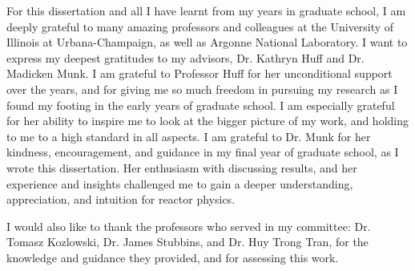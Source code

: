 For this dissertation and all I have learnt from my years in graduate school, 
I am deeply grateful to many amazing professors and colleagues at the University of 
Illinois at Urbana-Champaign, as well as Argonne National Laboratory. 
I want to express my deepest gratitudes to my advisors, Dr. Kathryn Huff and Dr. 
Madicken Munk. 
I am grateful to Professor Huff for her unconditional support over the years, and for 
giving me so much freedom in pursuing my research as I found my footing in the early 
years of graduate school. 
I am especially grateful for her ability to inspire me to look at the bigger picture of 
my work, and holding to me to a high standard in all aspects.
I am grateful to Dr. Munk for her kindness, encouragement, and guidance in my final year 
of graduate school, as I wrote this dissertation. 
Her enthusiasm with discussing results, and her experience and insights challenged me to 
gain a deeper understanding, appreciation, and intuition for reactor physics.  

I would also like to thank the professors who served in my committee: Dr. Tomasz 
Kozlowski, Dr. James Stubbins, and Dr. Huy Trong Tran, for the knowledge and guidance 
they provided, and for assessing this work. 








